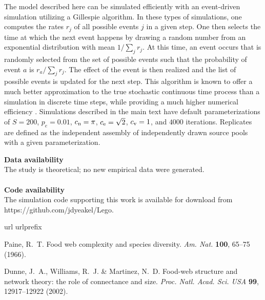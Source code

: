\documentclass[twocolumn,preprintnumbers,amsmath,amssymb,superscriptaddress,linenumbers]{revtex4-1}
\begin{document}
\begin{bibunit}
{  The model described here can be simulated efficiently with an event-driven simulation utilizing a Gillespie algorithm.
  In these types of simulations, one computes the rates $r_j$ of all possible events $j$ in a given step.
  One then selects the time at which the next event happens by drawing a random number from an exponential distribution with mean $1/\sum_j{r_j}$.
  At this time, an event occurs that is randomly selected from the set of possible events such that the probability of event $a$ is $r_a/\sum_j{r_j}$.
  The effect of the event is then realized and the list of possible events is updated for the next step.
  This algorithm is known to offer a much better approximation to the true stochastic continuous time process than a simulation in discrete time steps, while providing a much higher numerical efficiency \cite{Gillespie1977}.
  Simulations described in the main text have default parameterizations of $S=200$, $p_e=0.01$, $c_{\rm n} = \pi$, $c_{\rm e} = \sqrt{2}$, $c_{\rm v} = 1$, and $4000$ iterations.
  Replicates are defined as the independent assembly of independently drawn source pools with a given parameterization.}

\vspace{2mm}
\noindent \textbf{Data availability}\\
  \footnotesize{
  The study is theoretical; no new empirical data were generated.
  }\\ \\
\noindent \textbf{Code availability}\\
  \footnotesize{
  The simulation code supporting this work is available for download from https://github.com/jdyeakel/Lego.
  }\\

\begin{thebibliography}{10}
\expandafter\ifx\csname url\endcsname\relax
  \def\url#1{\texttt{#1}}\fi
\expandafter\ifx\csname urlprefix\endcsname\relax\def\urlprefix{URL }\fi
\providecommand{\bibinfo}[2]{#2}
\providecommand{\eprint}[2][]{\url{#2}}

\bibinfo{author}{Paine, R.~T.}
\newblock \bibinfo{title}{Food web complexity and species diversity}.
\newblock \emph{\bibinfo{journal}{Am. Nat.}} \textbf{\bibinfo{volume}{100}},
  \bibinfo{pages}{65--75} (\bibinfo{year}{1966}).

\bibinfo{author}{Dunne, J.~A.}, \bibinfo{author}{Williams, R.~J.} \&
  \bibinfo{author}{Martinez, N.~D.}
\newblock \bibinfo{title}{Food-web structure and network theory: the role of
  connectance and size}.
\newblock \emph{\bibinfo{journal}{Proc. Natl. Acad. Sci. USA}}
  \textbf{\bibinfo{volume}{99}}, \bibinfo{pages}{12917--12922}
  (\bibinfo{year}{2002}).


\end{thebibliography}
\end{bibunit}
\end{document}

